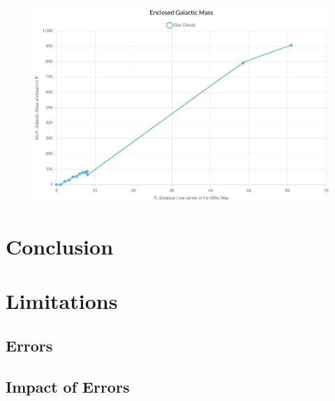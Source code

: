 \documentclass{article}
\begin{document}
\begin{center}
\begin{figure}[h!bt]
        \includegraphics[scale=0.1]{distance-enclosed-mass.jpg}
        \centering
    \end{figure}
\end{center}

\section{Conclusion}



\section{Limitations}



\subsection{Errors}



\subsection{Impact of Errors}
\end{document}
